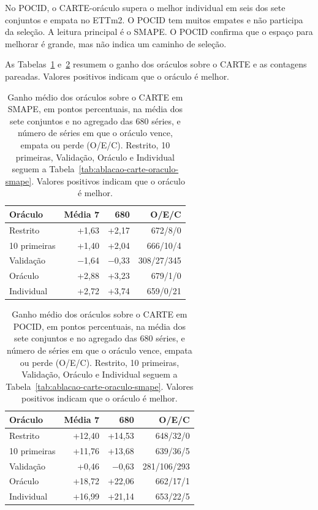 No POCID, o CARTE-oráculo supera o melhor individual em seis dos sete conjuntos e empata no ETTm2. O POCID tem muitos empates e não participa da seleção. A leitura principal é o SMAPE. O POCID confirma que o espaço para melhorar é grande, mas não indica um caminho de seleção.

As Tabelas~\ref{tab:ablacao-carte-oraculo-ganho-smape} e~\ref{tab:ablacao-carte-oraculo-ganho-pocid} resumem o ganho dos oráculos sobre o CARTE e as contagens pareadas. Valores positivos indicam que o oráculo é melhor.

\begin{table}[H]
\centering
\small
\setlength{\tabcolsep}{5pt}
\caption[Ganho dos oráculos sobre o CARTE em SMAPE.]{Ganho médio dos oráculos sobre o CARTE em SMAPE, em pontos percentuais, na média dos sete conjuntos e no agregado das 680 séries, e número de séries em que o oráculo vence, empata ou perde (O/E/C). Restrito, 10 primeiras, Validação, Oráculo e Individual seguem a Tabela~\ref{tab:ablacao-carte-oraculo-smape}. Valores positivos indicam que o oráculo é melhor.}
\label{tab:ablacao-carte-oraculo-ganho-smape}
\begin{tabular}{@{}lrrr@{}}
\toprule
\textbf{Oráculo} & \textbf{Média 7} & \textbf{680} & \textbf{O/E/C} \\
\midrule
Restrito      & +1,63 & +2,17 & 672/8/0 \\
10 primeiras  & +1,40 & +2,04 & 666/10/4 \\
Validação     & $-$1,64 & $-$0,33 & 308/27/345 \\
Oráculo       & +2,88 & +3,23 & 679/1/0 \\
Individual    & +2,72 & +3,74 & 659/0/21 \\
\bottomrule
\end{tabular}
\end{table}

\begin{table}[H]
\centering
\small
\setlength{\tabcolsep}{5pt}
\caption[Ganho dos oráculos sobre o CARTE em POCID.]{Ganho médio dos oráculos sobre o CARTE em POCID, em pontos percentuais, na média dos sete conjuntos e no agregado das 680 séries, e número de séries em que o oráculo vence, empata ou perde (O/E/C). Restrito, 10 primeiras, Validação, Oráculo e Individual seguem a Tabela~\ref{tab:ablacao-carte-oraculo-smape}. Valores positivos indicam que o oráculo é melhor.}
\label{tab:ablacao-carte-oraculo-ganho-pocid}
\begin{tabular}{@{}lrrr@{}}
\toprule
\textbf{Oráculo} & \textbf{Média 7} & \textbf{680} & \textbf{O/E/C} \\
\midrule
Restrito      & +12,40 & +14,53 & 648/32/0 \\
10 primeiras  & +11,76 & +13,68 & 639/36/5 \\
Validação     & +0,46 & $-$0,63 & 281/106/293 \\
Oráculo       & +18,72 & +22,06 & 662/17/1 \\
Individual    & +16,99 & +21,14 & 653/22/5 \\
\bottomrule
\end{tabular}
\end{table}

